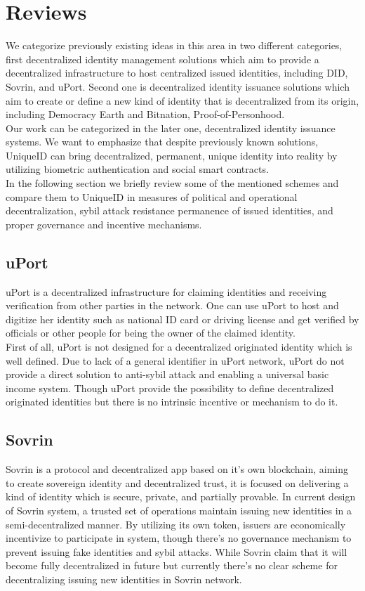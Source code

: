 \documentclass{article}
\begin{document}
\section{ Reviews}
We categorize previously existing ideas in this area in two different categories, first decentralized identity management solutions which aim to provide a decentralized infrastructure to host centralized issued identities, including DID, Sovrin, and uPort. Second one is decentralized identity issuance solutions which aim to create or define a new kind of identity that is decentralized from its origin, including Democracy Earth and Bitnation, Proof-of-Personhood.\\
Our work can be categorized in the later one, decentralized identity issuance systems. We want to emphasize that despite previously known solutions, UniqueID can bring decentralized, permanent, unique identity into reality by utilizing biometric authentication and social smart contracts. \\
In the following section we briefly review some of the mentioned schemes and compare them to UniqueID in measures of political and operational decentralization, sybil attack resistance  permanence of issued identities, and proper governance and incentive mechanisms. 

\subsection{uPort}

uPort is a decentralized infrastructure for claiming identities and receiving verification from other parties in the network. One can use uPort to host and digitize her identity such as national ID card or driving license and get verified by officials or other people for being the owner of the claimed identity.\\
 First of all, uPort is not designed for a decentralized originated identity which is well defined. Due to lack of a general identifier in uPort network, uPort do not provide a direct solution to anti-sybil attack and enabling a universal basic income system. Though uPort provide the possibility to define decentralized originated identities but there is no intrinsic incentive or mechanism to do it.

\subsection{Sovrin}

Sovrin is a protocol and decentralized app based on it’s own blockchain, aiming to create sovereign identity and decentralized trust, it is focused on delivering a kind of identity which is secure, private, and partially provable. In current design of Sovrin system, a trusted set of operations maintain issuing new identities in a semi-decentralized manner. By utilizing its own token, issuers are economically incentivize to participate in system, though there’s no governance mechanism to prevent issuing fake identities and sybil attacks. While Sovrin claim that it will become fully decentralized in future but currently there’s no clear scheme for decentralizing issuing new identities in Sovrin network. 
\end{document}

